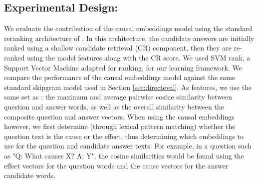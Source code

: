 \subsection{Experimental Design:}
We evaluate the contribution of the causal embeddings model using the standard reranking architecture  of .
In this architecture, the candidate answers are initially ranked using a shallow candidate retrieval (CR) component, then they are re-ranked using the model features along with the CR score. 
We used SVM rank, a Support Vector Machine adapted for ranking, for our learning framework.
We compare the performance of the causal embeddings model against the same standard skipgram model used in Section \ref{sec:directeval}.
As features, we use the same set as : the maximum and average pairwise cosine similarity between question and answer words, as well as the overall similarity between the composite question and answer vectors.  When using the causal embeddings however, we first determine (through lexical pattern matching) whether the question text is the cause or the effect, thus determining which embeddings to use for the question and candidate answer texts.  For example, in a question such as "Q: What causes X? A: Y", the cosine similarities would be found using the effect vectors for the question words and the cause vectors for the answer candidate words.    

